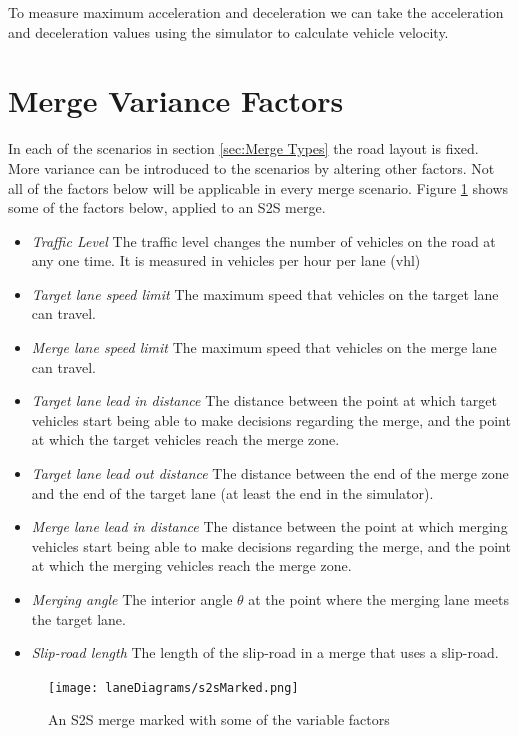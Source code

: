 To measure maximum acceleration and deceleration we can take the acceleration and deceleration values using the simulator to calculate vehicle velocity.

\section{Merge Variance Factors}
\label{sec:Merge Variance Factors}
In each of the scenarios in section \ref{sec:Merge Types} the road layout is fixed. More variance can be introduced to the scenarios by altering other factors. Not all of the factors below will be applicable in every merge scenario. Figure \ref{fig:s2sMarked} shows some of the factors below, applied to an S2S merge.

\begin{itemize}
\item \textit{Traffic Level} 
The traffic level changes the number of vehicles on the road at any one time. It is measured in vehicles per hour per lane (\si{vhl})
\item \textit{Target lane speed limit}
The maximum speed that vehicles on the target lane can travel.
\item \textit{Merge lane speed limit}
The maximum speed that vehicles on the merge lane can travel.
\item \textit{Target lane lead in distance}
The distance between the point at which target vehicles start being able to make decisions regarding the merge, and the point at which the target vehicles reach the merge zone.
\item \textit{Target lane lead out distance}
The distance between the end of the merge zone and the end of the target lane (at least the end in the simulator).
\item \textit{Merge lane lead in distance}
The distance between the point at which merging vehicles start being able to make decisions regarding the merge, and the point at which the merging vehicles reach the merge zone.
\item \textit{Merging angle}
The interior angle $\theta$ at the point where the merging lane meets the target lane.
\item \textit{Slip-road length}
The length of the slip-road in a merge that uses a slip-road.
\end{itemize}

\begin{figure}[htb]
\texttt{[image: laneDiagrams/s2sMarked.png]}
\caption{An S2S merge marked with some of the variable factors}
\label{fig:s2sMarked}
\end{figure}

